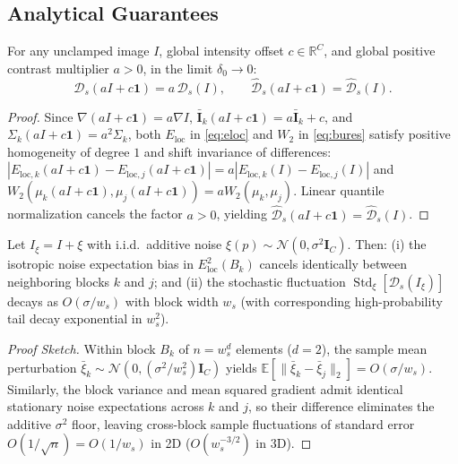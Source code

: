 \subsection{Analytical Guarantees}

\begin{theorem}
For any unclamped image $I$, global intensity offset $c \in \mathbb{R}^C$, and global positive contrast multiplier $a > 0$, in the limit $\delta_0 \to 0$:
\[
\mathcal{D}_s(aI + c\mathbf{1}) = a\,\mathcal{D}_s(I), \qquad \widehat{\mathcal{D}}_s(aI + c\mathbf{1}) = \widehat{\mathcal{D}}_s(I).
\]
\end{theorem}
\begin{proof}
Since $\nabla(aI + c\mathbf{1}) = a\nabla I$, $\bar{\mathbf{I}}_k(aI+c\mathbf{1}) = a\bar{\mathbf{I}}_k + c$, and $\Sigma_k(aI+c\mathbf{1}) = a^2 \Sigma_k$, both $E_{\mathrm{loc}}$ in \eqref{eq:eloc} and $W_2$ in \eqref{eq:bures} satisfy positive homogeneity of degree $1$ and shift invariance of differences: $|E_{\mathrm{loc},k}(aI+c\mathbf{1}) - E_{\mathrm{loc},j}(aI+c\mathbf{1})| = a|E_{\mathrm{loc},k}(I) - E_{\mathrm{loc},j}(I)|$ and $W_2(\mu_k(aI+c\mathbf{1}), \mu_j(aI+c\mathbf{1})) = a W_2(\mu_k, \mu_j)$. Linear quantile normalization cancels the factor $a > 0$, yielding $\widehat{\mathcal{D}}_s(aI+c\mathbf{1}) = \widehat{\mathcal{D}}_s(I)$.
\end{proof}

\begin{theorem}
Let $I_\xi = I + \xi$ with i.i.d.\ additive noise $\xi(p) \sim \mathcal{N}(0, \sigma^2 \mathbf{I}_C)$. Then:
(i) the isotropic noise expectation bias in $E_{\mathrm{loc}}^2(B_k)$ cancels identically between neighboring blocks $k$ and $j$; and
(ii) the stochastic fluctuation $\operatorname{Std}_\xi[\mathcal{D}_s(I_\xi)]$ decays as $O(\sigma / w_s)$ with block width $w_s$ (with corresponding high-probability tail decay exponential in $w_s^2$).
\end{theorem}
\begin{proof}[Proof Sketch]
Within block $B_k$ of $n = w_s^d$ elements ($d=2$), the sample mean perturbation $\bar{\xi}_k \sim \mathcal{N}(0, (\sigma^2 / w_s^2)\mathbf{I}_C)$ yields $\mathbb{E}[\lVert \bar{\xi}_k - \bar{\xi}_j\rVert_2] = O(\sigma / w_s)$. Similarly, the block variance and mean squared gradient admit identical stationary noise expectations across $k$ and $j$, so their difference eliminates the additive $\sigma^2$ floor, leaving cross-block sample fluctuations of standard error $O(1/\sqrt{n}) = O(1/w_s)$ in 2D ($O(w_s^{-3/2})$ in 3D).
\end{proof}

